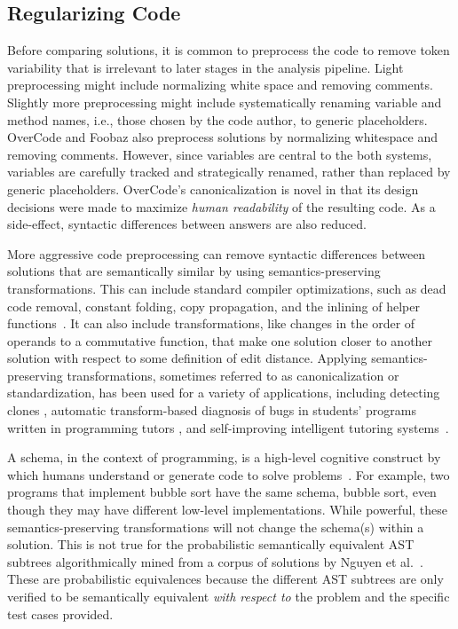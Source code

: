 \subsection{Regularizing Code}
Before comparing solutions, it is common to preprocess the code to remove token variability that is irrelevant to later stages in the analysis pipeline. Light preprocessing might include normalizing white space and removing comments. Slightly more preprocessing might include systematically renaming variable and method names, i.e., those chosen by the code author, to generic placeholders. OverCode and Foobaz also preprocess solutions by normalizing whitespace and removing comments. However, since variables are central to the both systems, variables are carefully tracked and strategically renamed, rather than replaced by generic placeholders. OverCode’s canonicalization is novel in that its design decisions were made to maximize {\it human readability} of the resulting code. As a side-effect, syntactic differences between answers are also reduced.


More aggressive code preprocessing can remove syntactic differences between solutions that are semantically similar by using semantics-preserving transformations. This can include standard compiler optimizations, such as dead code removal, constant folding, copy propagation, and the inlining of helper functions~\cite{rivers2015data}. It can also include transformations, like changes in the order of operands to a commutative function, that make one solution closer to another solution with respect to some definition of edit distance. Applying semantics-preserving transformations, sometimes referred to as canonicalization or standardization, has been used for a variety of applications, including detecting clones \cite{baxter,CCFinder}, automatic transform-based diagnosis of bugs in students' programs written in programming tutors \cite{xutransformation}, and self-improving intelligent tutoring systems~\cite{rivers2015data}. 

A schema, in the context of programming, is a high-level cognitive construct by which humans understand or generate code to solve problems~\cite{Soloway1984}. For example, two programs that implement bubble sort have the same schema, bubble sort, even though they may have different low-level implementations. While powerful, these semantics-preserving transformations will not change the schema(s) within a solution. This is not true for the probabilistic semantically equivalent AST subtrees algorithmically mined from a corpus of solutions by Nguyen et al.~\cite{codewebs}. These are probabilistic equivalences because the different AST subtrees are only verified to be semantically equivalent {\it with respect to} the problem and the specific test cases provided. 


